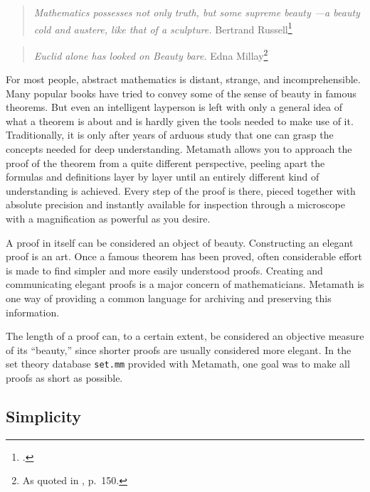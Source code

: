 \begin{quote}
  {\em Mathematics possesses not only truth, but some supreme beauty ---a
  beauty cold and austere, like that of a sculpture.}
    \flushright\sc  Bertrand
    Russell\footnote{\cite{Russell}.}\\
\end{quote}

\begin{quote}
  {\em Euclid alone has looked on Beauty bare.}
  \flushright\sc Edna Millay\footnote{As quoted in \cite{Davis}, p.~150.}\\
\end{quote}

For most people, abstract mathematics is distant, strange, and
incomprehensible.  Many popular books have tried to convey some of the sense
of beauty in famous theorems.  But even an intelligent layperson is left with
only a general idea of what a theorem is about and is hardly given the tools
needed to make use of it.  Traditionally, it is only after years of arduous
study that one can grasp the concepts needed for deep understanding.
Metamath allows you to approach the proof of the theorem from
a quite different perspective, peeling apart the formulas and definitions
layer by layer until an entirely different kind of understanding is achieved.
Every step of the proof is there, pieced together with absolute precision and
instantly available for inspection through a microscope with a magnification
as powerful as you desire.

A proof in itself can be considered an object of beauty.  Constructing an
elegant proof is an art.  Once a famous theorem has been proved, often
considerable effort is made to find simpler and more easily understood
proofs.  Creating and communicating elegant proofs is a major concern of
mathematicians.  Metamath is one way of providing a common language for
archiving and preserving this information.

The length of a proof can, to a certain extent, be considered an
objective measure of its ``beauty,'' since shorter proofs are usually
considered more elegant.  In the set theory database
\texttt{set.mm}%
provided with Metamath, one goal was to make all proofs as short as possible.

\subsection{Simplicity}

